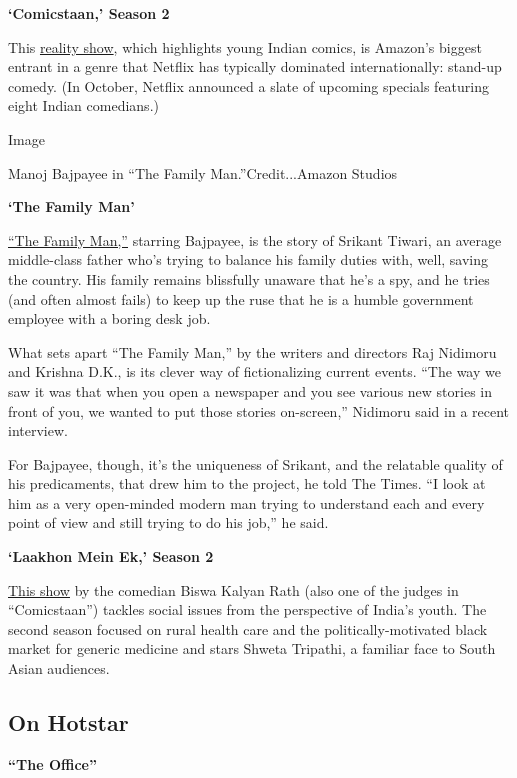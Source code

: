 \textbf{`Comicstaan,' Season 2}

This \href{https://www.youtube.com/watch?v=J4tAE4T72Bk}{reality show},
which highlights young Indian comics, is Amazon's biggest entrant in a
genre that Netflix has typically dominated internationally: stand-up
comedy. (In October, Netflix announced a slate of upcoming specials
featuring eight Indian comedians.)

Image

Manoj Bajpayee in ``The Family Man.''Credit...Amazon Studios

\textbf{`The Family Man'}

\href{https://www.youtube.com/watch?v=XatRGut65VI}{``The Family Man,''}
starring Bajpayee, is the story of Srikant Tiwari, an average
middle-class father who's trying to balance his family duties with,
well, saving the country. His family remains blissfully unaware that
he's a spy, and he tries (and often almost fails) to keep up the ruse
that he is a humble government employee with a boring desk job.

What sets apart ``The Family Man,'' by the writers and directors Raj
Nidimoru and Krishna D.K., is its clever way of fictionalizing current
events. ``The way we saw it was that when you open a newspaper and you
see various new stories in front of you, we wanted to put those stories
on-screen,'' Nidimoru said in a recent interview.

For Bajpayee, though, it's the uniqueness of Srikant, and the relatable
quality of his predicaments, that drew him to the project, he told The
Times. ``I look at him as a very open-minded modern man trying to
understand each and every point of view and still trying to do his
job,'' he said.

\textbf{`Laakhon Mein Ek,' Season 2}

\href{https://www.youtube.com/watch?v=bkVb9fguwuc}{This show} by the
comedian Biswa Kalyan Rath (also one of the judges in ``Comicstaan'')
tackles social issues from the perspective of India's youth. The second
season focused on rural health care and the politically-motivated black
market for generic medicine and stars Shweta Tripathi, a familiar face
to South Asian audiences.

\hypertarget{on-hotstar}{%
\subsection{On Hotstar}\label{on-hotstar}}

\textbf{``The Office''}

